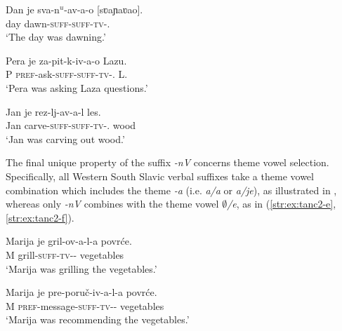 \documentclass[output=paper,colorlinks,citecolor=brown]{langscibook}
\begin{document}
 \ea\label{str:ex:tanc1}


\ex \gll Dan je sva-n$^u$-av-a-o [sʋaɲaʋao].\\ 
day {\AUX} dawn-\textsc{suff-suff-tv}-{\PST.\MASC}\\ 
\glt `The day was dawning.'
 \label{str:ex:tanc1-c}

 \ex \gll Pera je za-pit-k-iv-a-o Lazu.\\ 
P {\AUX} \textsc{pref}-ask-\textsc{suff-suff-tv}-{\PST.\MASC} L.\\ 
\glt `Pera was asking Laza questions.'
 \label{str:zapitkivao}

\ex \gll Jan je rez-lj-av-a-l les.\\ %
Jan {\AUX} carve-\textsc{suff-suff-tv}-{\PST.\MASC} wood\\ 
\glt `Jan was carving out wood.'
 \label{str:ex:tanc1-d}

\z
\z

\noindent The final unique property of the suffix \textit{-nV} concerns theme vowel selection. Specifically, all Western South Slavic verbal suffixes take a theme vowel combination which includes the theme \textit{-a} (i.e. \textit{a/a} or \textit{a/je}), as illustrated in , whereas only \textit{-nV} combines with the theme vowel \textit{$∅$/e}, as in (\ref{str:ex:tanc2-e}, \ref{str:ex:tanc2-f}).

 \ea\label{str:ex:tanc2}
	\ea \gll Marija je gril-ov-a-l-a povrće.\\ 
M {\AUX} grill-\textsc{suff-tv}-{\PST-\FEM} vegetables\\ 
\glt `Marija was grilling the vegetables.'\label{str:ex:tanc2-a}

\ex \gll Marija je pre-poruč-iv-a-l-a povrće.\\ 
M {\AUX} \textsc{pref}-message-\textsc{suff-tv}-{\PST-\FEM} vegetables\\ 
\glt `Marija was recommending the vegetables.' \label{str:ex:tanc2-b}
\end{document}
